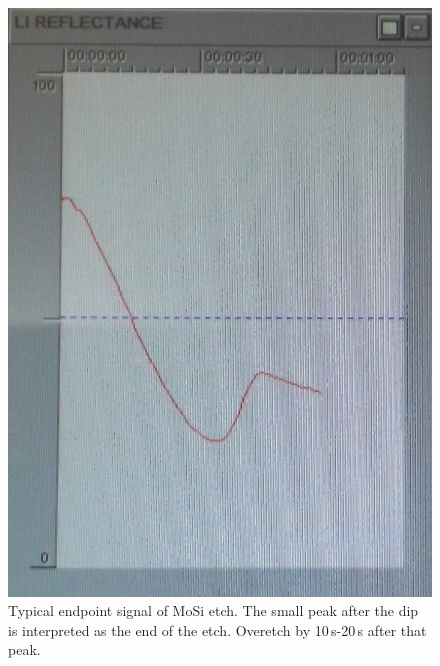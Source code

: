 \begin{figure}[!h]
\centering
\includegraphics[width=14cm]{figures/oxford_MoSi_etch.png}
\caption{\label{fig:oxford_MoSi_etch}Typical endpoint signal of MoSi etch. The small peak after the dip is interpreted as the end of the etch. Overetch by 10\,s-20\,s after that peak.}
\end{figure}

